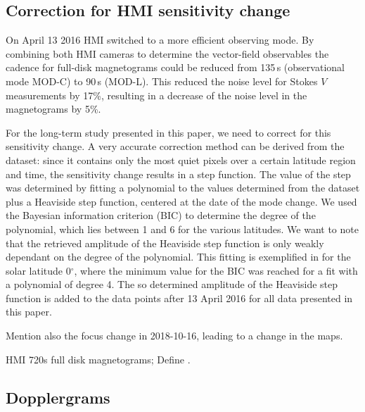 \documentclass{aa}
\begin{document}
\subsection{Correction for HMI sensitivity change}

On April 13 2016 HMI switched to a more efficient observing mode. By combining both HMI cameras to determine the vector-field observables the cadence for full-disk magnetograms could be reduced from 135\,s (observational mode MOD-C) to 90\,s (MOD-L). This reduced the noise level for Stokes $V$ measurements by 17\%, resulting in a decrease of the noise level in the \los{} magnetograms by 5\%.

For the long-term study presented in this paper, we need to correct for this sensitivity change. A very accurate correction method can be derived from the \IN{} dataset: since it contains only the most quiet pixels over a certain latitude region and time, the sensitivity change results in a step function. The value of the step was determined by fitting a polynomial to the \brms{} values determined from the \IN{} dataset plus a Heaviside step function, centered at the date of the mode change. We used the Bayesian information criterion (BIC)\cite[]{Stoica2004}
to determine the degree of the polynomial, which lies between 1 and 6 for the various latitudes. We want to note that the retrieved amplitude of the Heaviside step function is only weakly dependant on the degree of the polynomial. This fitting is exemplified in  for the solar latitude 0$^\circ$, where the minimum value for the BIC was reached for a fit with a polynomial of degree 4. The so determined amplitude of the Heaviside step function is added to the data points after 13 April 2016 for all data presented in this paper.


Mention also the focus change in 2018-10-16, leading to a change in the \los{} maps. 

HMI 720s full disk magnetograms; 
Define \brms{}.

\subsection{Dopplergrams}
\end{document}
